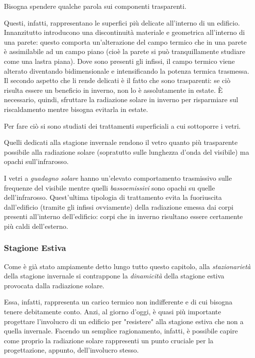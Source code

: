 Bisogna spendere qualche parola sui componenti trasparenti.

Questi, infatti, rappresentano le superfici più delicate all'interno di un edificio. Innanzitutto introducono una discontinuità materiale e geometrica all'interno di una parete: questo comporta un'alterazione del campo termico che in una parete è assimilabile ad un campo piano (cioè la parete si può tranquillamente studiare come una lastra piana). Dove sono presenti gli infissi, il campo termico viene alterato diventando bidimensionale e intensificando la potenza termica trasmessa. Il secondo aspetto che li rende delicati è il fatto che sono trasparenti: se ciò risulta essere un beneficio in inverno, non lo è assolutamente in estate. È necessario, quindi, sfruttare la radiazione solare in inverno per risparmiare sul riscaldamento mentre bisogna evitarla in estate.

Per fare ciò si sono studiati dei trattamenti superficiali a cui sottoporre i vetri.

Quelli dedicati alla stagione invernale rendono il vetro quanto più trasparente possibile alla radiazione solare (sopratutto sulle lunghezza d'onda del visibile) ma opachi sull'infrarosso.

I vetri a \emph{guadagno solare} hanno un'elevato comportamento trasmissivo sulle frequenze del visibile mentre quelli \emph{bassoemissivi} sono opachi su quelle dell'infrarosso. Quest'ultima tipologia di trattamento evita la fuoriuscita dall'edificio (tramite gli infissi ovviamente) della radiazione emessa dai corpi presenti all'interno dell'edificio: corpi che in inverno risultano essere certamente più caldi dell'esterno.

\subsubsection{Stagione Estiva}
Come è già stato ampiamente detto lungo tutto questo capitolo, alla \emph{stazionarietà} della stagione invernale si contrappone la \emph{dinamicità} della stagione estiva provocata dalla radiazione solare.

Essa, infatti, rappresenta un carico termico non indifferente e di cui bisogna tenere debitamente conto. Anzi, al giorno d'oggi, è quasi più importante progettare l'involucro di un edificio per "resistere" alla stagione estiva che non a quella invernale. Facendo un semplice ragionamento, infatti, è possibile capire come proprio la radiazione solare rappresenti un punto cruciale per la progettazione, appunto, dell'involucro stesso.


